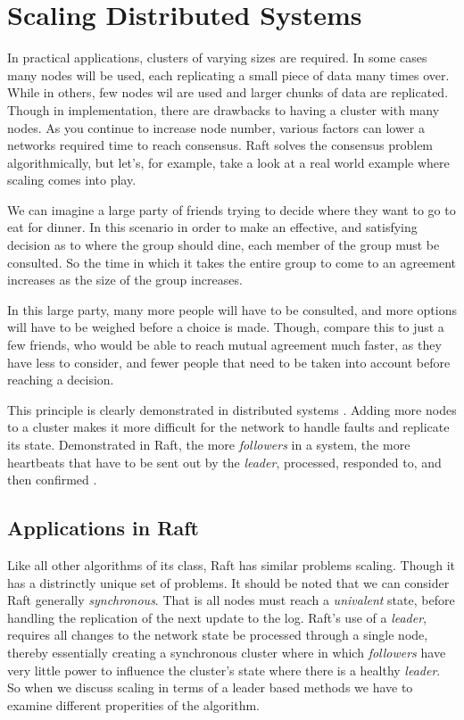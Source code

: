 \section{Scaling Distributed Systems}

In practical applications, clusters of varying sizes are required. In some cases many nodes will be used, each replicating a small piece of data many times over. While in others, few nodes wil are used and larger chunks of data are replicated. Though in implementation, there are drawbacks to having a cluster with many nodes. As you continue to increase node number, various factors can lower a networks required time to reach consensus. Raft solves the consensus problem algorithmically, but let's, for example, take a look at a real world example where scaling comes into play.

We can imagine a large party of friends trying to decide where they want to go to eat for dinner. In this scenario in order to make an effective, and satisfying decision as to where the group should dine, each member of the group must be consulted. So the time in which it takes the entire group to come to an agreement increases as the size of the group increases.

In this large party, many more people will have to be consulted, and more options will have to be weighed before a choice is made. Though, compare this to just a few friends, who would be able to reach mutual agreement much faster, as they have less to consider, and fewer people that need to be taken into account before reaching a decision.

This principle is clearly demonstrated in distributed systems \cite{NeumanScaling}. Adding more nodes to a cluster makes it more difficult for the network to handle faults and replicate its state. Demonstrated in Raft, the more \textit{followers} in a system, the more heartbeats that have to be sent out by the \textit{leader}, processed, responded to, and then confirmed \cite{OngaroRaft}.


\subsection{Applications in Raft}

Like all other algorithms of its class, Raft has similar problems scaling. Though it has a distrinctly unique set of problems. It should be noted that we can consider Raft generally \textit{synchronous}. That is all nodes must reach a \textit{univalent} state, before handling the replication of the next update to the log. Raft's use of a \textit{leader}, requires all changes to the network state be processed through a single node, thereby essentially creating a synchronous cluster where in which \textit{followers} have very little power to influence the cluster's state where there is a healthy \textit{leader}. So when we discuss scaling in terms of a leader based methods we have to examine different properities of the algorithm.